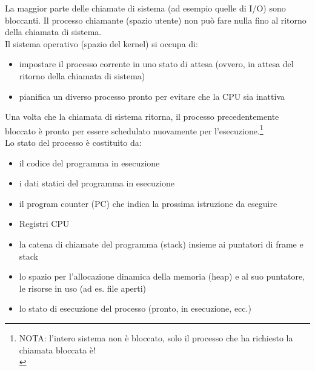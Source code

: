 \documentclass{article}
\begin{document}
La maggior parte delle chiamate di sistema (ad esempio quelle di I/O) sono bloccanti. Il processo chiamante (spazio utente) non può fare nulla fino al ritorno della chiamata di sistema.\\
 Il sistema operativo (spazio del kernel) si occupa di:
\begin{itemize}
    \item impostare il processo corrente in uno stato di attesa (ovvero, in attesa del ritorno della chiamata di sistema)
    \item  pianifica un diverso processo pronto per evitare che la CPU sia inattiva
\end{itemize} 
Una volta che la chiamata di sistema ritorna, il processo precedentemente bloccato è pronto per essere schedulato nuovamente per l'esecuzione.\footnote{NOTA: l'intero sistema non è bloccato, solo il processo che ha richiesto la chiamata bloccata è!\\}\\
Lo stato del processo è costituito da: 
\begin{itemize}
    \item il codice del programma in esecuzione
    \item i dati statici del programma in esecuzione
    \item il program counter (PC) che indica la prossima istruzione da eseguire
    \item Registri CPU
    \item la catena di chiamate del programma (stack) insieme ai puntatori di frame e stack
    \item lo spazio per l'allocazione dinamica della memoria (heap) e al suo puntatore, le risorse in uso (ad es. file aperti)
    \item lo stato di esecuzione del processo (pronto, in esecuzione, ecc.)
\end{itemize}
\end{document}
